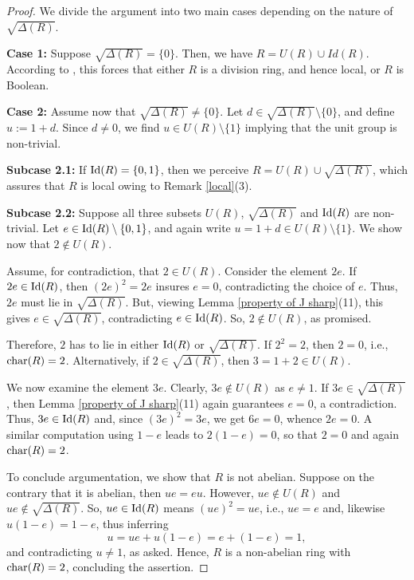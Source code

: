 \documentclass[11pt]{amsart}
\theoremstyle{definition}
\begin{document}
\begin{proof}
We divide the argument into two main cases depending on the nature of $\sqrt{\Delta(R)}$.

\medskip
	
\textbf{Case 1:} Suppose $\sqrt{\Delta(R)} = \{0\}$. Then, we have $R = U(R) \cup Id(R)$. According to \cite[Theorem 2.4]{cc}, this forces that either $R$ is a division ring, and hence local, or $R$ is Boolean.

\medskip
	
\textbf{Case 2:} Assume now that $\sqrt{\Delta(R)} \neq \{0\}$. Let $d \in \sqrt{\Delta(R)} \setminus \{0\}$, and define $u := 1 + d$. Since $d \not= 0$, we find $u \in U(R) \setminus \{1\}$ implying that the unit group is non-trivial.

\medskip
	
\textbf{Subcase 2.1:} If ${\rm Id}(R) = \{0,1\}$, then we perceive $R = U(R) \cup \sqrt{\Delta(R)}$, which assures that $R$ is local owing to Remark \ref{local}(3).

\medskip
	
\textbf{Subcase 2.2:} Suppose all three subsets $U(R)$, $\sqrt{\Delta(R)}$ and ${\rm Id}(R)$ are non-trivial. Let $e \in {\rm Id}(R) \setminus \{0,1\}$, and again write $u = 1 + d \in U(R) \setminus \{1\}$. We show now that $2 \not\in U(R)$.
	
Assume, for contradiction, that $2 \in U(R)$. Consider the element $2e$. If $2e \in {\rm Id}(R)$, then $(2e)^2 = 2e$ insures $e = 0$, contradicting the choice of $e$. Thus, $2e$ must lie in $\sqrt{\Delta(R)}$. But, viewing Lemma \ref{property of J sharp}(11), this gives $e \in \sqrt{\Delta(R)}$, contradicting $e \in {\rm Id}(R)$. So, $2 \not\in U(R)$, as promised.
	
Therefore, $2$ has to lie in either ${\rm Id}(R)$ or $\sqrt{\Delta(R)}$. If $2^2 = 2$, then $2 = 0$, i.e., ${\rm char}(R) = 2$. Alternatively, if $2 \in \sqrt{\Delta(R)}$, then $3 = 1 + 2 \in U(R)$.
	
We now examine the element $3e$. Clearly, $3e \not\in U(R)$ as $e \neq 1$. If $3e \in \sqrt{\Delta(R)}$, then Lemma \ref{property of J sharp}(11) again guarantees $e = 0$, a contradiction. Thus, $3e \in {\rm Id}(R)$ and, since $(3e)^2 = 3e$, we get $6e = 0$, whence $2e = 0$. A similar computation using $1 - e$ leads to $2(1 - e) = 0$, so that $2 = 0$ and again ${\rm char}(R) = 2$.
	
To conclude argumentation, we show that $R$ is not abelian. Suppose on the contrary that it is abelian, then $ue = eu$. However, $ue \not\in U(R)$ and $ue \not\in \sqrt{\Delta(R)}$. So, $ue \in {\rm Id}(R)$ means $(ue)^2 = ue$, i.e., $ue = e$ and, likewise $u(1 - e) = 1 - e$, thus inferring $$u = ue + u(1 - e) = e + (1 - e) = 1,$$ and contradicting $u \not= 1$, as asked. Hence, $R$ is a non-abelian ring with ${\rm char}(R) = 2$, concluding the assertion.
\end{proof}
\end{document}
